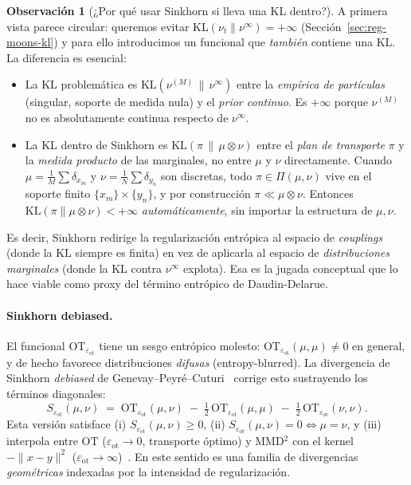 \documentclass[11pt, a4paper]{article}
\theoremstyle{definition}
\newtheorem{remark}{Observación}[section]
\newcommand{\eps}{\varepsilon}
\begin{document}
\begin{remark}[¿Por qué usar Sinkhorn si lleva una KL dentro?]
\label{rem:sinkhorn-kl}
A primera vista parece circular: queremos evitar
$\mathrm{KL}(\nu_t \| \nu^\infty) = +\infty$ (Sección~\ref{sec:reg-moons-kl})
y para ello introducimos un funcional que \emph{también} contiene
una KL. La diferencia es esencial:
\begin{itemize}
  \item La KL problemática es
        $\mathrm{KL}(\nu^{(M)} \,\|\, \nu^\infty)$ entre la
        \emph{empírica de partículas} (singular, soporte de
        medida nula) y el \emph{prior continuo}. Es $+\infty$
        porque $\nu^{(M)}$ no es absolutamente continua respecto
        de $\nu^\infty$.
  \item La KL dentro de Sinkhorn es
        $\mathrm{KL}(\pi \,\|\, \mu\otimes\nu)$ entre el
        \emph{plan de transporte} $\pi$ y la \emph{medida producto}
        de las marginales, no entre $\mu$ y $\nu$ directamente.
        Cuando $\mu = \tfrac1M\sum\delta_{x_m}$ y
        $\nu = \tfrac1N\sum\delta_{y_n}$ son discretas, todo
        $\pi\in\Pi(\mu,\nu)$ vive en el soporte finito
        $\{x_m\}\times\{y_n\}$, y por construcción
        $\pi\ll\mu\otimes\nu$. Entonces
        $\mathrm{KL}(\pi\|\mu\otimes\nu)<+\infty$
        \emph{automáticamente}, sin importar la estructura de
        $\mu, \nu$.
\end{itemize}
Es decir, Sinkhorn redirige la regularización entrópica al espacio
de \emph{couplings} (donde la KL siempre es finita) en vez de
aplicarla al espacio de \emph{distribuciones marginales} (donde la
KL contra $\nu^\infty$ explota). Esa es la jugada conceptual que lo
hace viable como proxy del término entrópico de Daudin-Delarue.
\end{remark}

\paragraph{Sinkhorn debiased.} El funcional
$\mathrm{OT}_{\eps_{\mathrm{ot}}}$ tiene un sesgo entrópico molesto:
$\mathrm{OT}_{\eps_{\mathrm{ot}}}(\mu,\mu) \neq 0$ en general, y de
hecho favorece distribuciones \emph{difusas} (entropy-blurred). La
divergencia de Sinkhorn \emph{debiased} de
Genevay--Peyré--Cuturi~\cite{Genevay2018,Feydy2019} corrige esto
sustrayendo los términos diagonales:
\[
  S_{\eps_{\mathrm{ot}}}(\mu,\nu) \;=\;
  \mathrm{OT}_{\eps_{\mathrm{ot}}}(\mu,\nu)
  \;-\; \tfrac12\,\mathrm{OT}_{\eps_{\mathrm{ot}}}(\mu,\mu)
  \;-\; \tfrac12\,\mathrm{OT}_{\eps_{\mathrm{ot}}}(\nu,\nu).
\]
Esta versión satisface (i) $S_{\eps_{\mathrm{ot}}}(\mu,\nu)\geq 0$,
(ii) $S_{\eps_{\mathrm{ot}}}(\mu,\nu)=0\iff \mu=\nu$, y (iii)
interpola entre $\mathrm{OT}$ ($\eps_{\mathrm{ot}}\to 0$, transporte
óptimo) y MMD$^2$ con el kernel $-\|x-y\|^2$
($\eps_{\mathrm{ot}}\to\infty$)~\cite{Feydy2019}. En este sentido
es una familia de divergencias \emph{geométricas} indexadas por la
intensidad de regularización.
\end{document}
